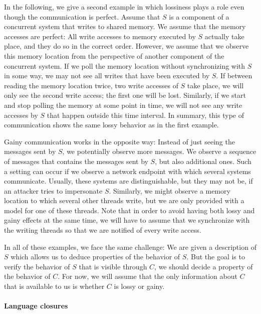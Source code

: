 \documentclass[../../diss.tex]{subfiles}
\begin{document}
In the following, we give a second example in which lossiness plays a role even though the communication is perfect.
Assume that $S$ is a component of a concurrent system that writes to shared memory.
We assume that the memory accesses are perfect: All write accesses to memory executed by $S$ actually take place, and they do so in the correct order.
However, we assume that we observe this memory location from the perspective of another component of the concurrent system.
If we poll the memory location without synchronizing with $S$ in some way, we may not see all writes that have been executed by $S$.
If between reading the memory location twice, two write accesses of $S$ take place, we will only see the second write access; the first one will be lost.
Similarly, if we start and stop polling the memory at some point in time, we will not see any write accesses by $S$ that happen outside this time interval.
In summary, this type of communication shows the same lossy behavior as in the first example.

Gainy communication works in the opposite way:
Instead of just seeing the messages sent by $S$, we potentially observe more messages.
We observe a sequence of messages that contains the messages sent by $S$, but also additional ones.
Such a setting can occur if we observe a network endpoint with which several systems communicate.
Usually, these systems are distinguishable, but they may not be, \eg if an attacker tries to impersonate $S$.
Similarly, we might observe a memory location to which several other threads write, but we are only provided with a model for one of these threads.
Note that in order to avoid having both lossy and gainy effects at the same time, we will have to assume that we synchronize with the writing threads so that we are notified of every write access.

In all of these examples, we face the same challenge:
We are given a description of $S$ which allows us to deduce properties of the behavior of $S$.
But the goal is to verify the behavior of $S$ that is visible through $C$, \ie we should decide a property of the behavior of $C$.
For now, we will assume that the only information about $C$ that is available to us is whether $C$ is lossy or gainy.

\paragraph{Language closures}
\end{document}
